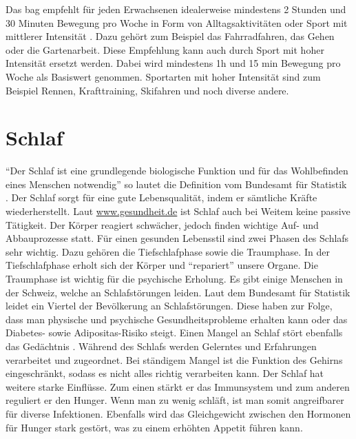 Das \acs{bag} empfehlt für jeden Erwachsenen idealerweise mindestens 2 Stunden und 30 Minuten Bewegung pro Woche in Form von Alltagsaktivitäten oder Sport mit mittlerer Intensität \cite{bewegungsfoerderung}. Dazu gehört zum Beispiel das Fahrradfahren, das Gehen oder die Gartenarbeit. Diese Empfehlung kann auch durch Sport mit hoher Intensität ersetzt werden. Dabei wird mindestens 1h und 15 min Bewegung pro Woche als Basiswert genommen. Sportarten mit hoher Intensität sind zum Beispiel Rennen, Krafttraining, Skifahren und noch diverse andere. 
\section{Schlaf}
\authortoc{\bastian}{\sectionident}
“Der Schlaf ist eine grundlegende biologische Funktion und für das Wohlbefinden eines Menschen notwendig” so lautet die Definition vom Bundesamt für Statistik \cite{bundesamtfrstatistik_2015_schlafstoerungen}.
\newline
Der Schlaf sorgt für eine gute Lebensqualität, indem er sämtliche Kräfte wiederherstellt. Laut \url{www.gesundheit.de} \cite{schlaf-grundbeduerfnis-und-lebenselixier} ist Schlaf auch bei Weitem keine passive Tätigkeit. Der Körper reagiert schwächer, jedoch finden wichtige Auf- und Abbauprozesse statt. Für einen gesunden Lebensstil sind zwei Phasen des Schlafs sehr wichtig. Dazu gehören die Tiefschlafphase sowie die Traumphase. In der Tiefschlafphase erholt sich der Körper und “repariert” unsere Organe. Die Traumphase ist wichtig für die psychische Erholung. Es gibt einige Menschen in der Schweiz, welche an Schlafstörungen leiden. Laut dem Bundesamt für Statistik leidet ein Viertel der Bevölkerung an Schlafstörungen. Diese haben zur Folge, dass man physische und psychische Gesundheitsprobleme erhalten kann oder das Diabetes- sowie Adipositas-Risiko steigt. Einen Mangel an Schlaf stört ebenfalls das Gedächtnis \cite{schlaf-grundbeduerfnis-und-lebenselixier}. Während des Schlafs werden Gelerntes und Erfahrungen verarbeitet und zugeordnet. Bei ständigem Mangel ist die Funktion des Gehirns eingeschränkt, sodass es nicht alles richtig verarbeiten kann. Der Schlaf hat weitere starke Einflüsse. Zum einen stärkt er das Immunsystem und zum anderen reguliert er den Hunger. Wenn man zu wenig schläft, ist man somit angreifbarer für diverse Infektionen. Ebenfalls wird das Gleichgewicht zwischen den Hormonen für Hunger stark gestört, was zu einem erhöhten Appetit führen kann.
